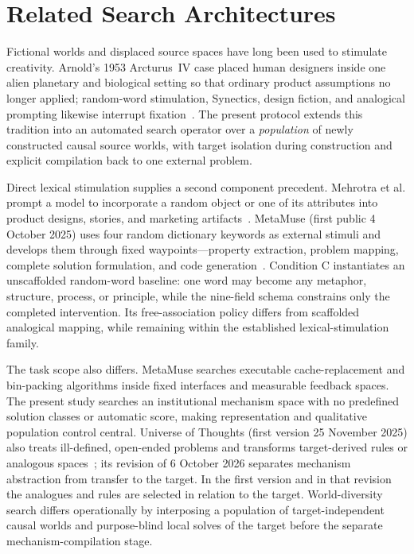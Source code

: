 \documentclass[11pt,a4paper]{article}
\begin{document}
\FloatBarrier

\section{Related Search Architectures}
\label{sec:related}

Fictional worlds and displaced source spaces have long been used to stimulate creativity. Arnold's 1953 Arcturus~IV case placed human designers inside one alien planetary and biological setting so that ordinary product assumptions no longer applied; random-word stimulation, Synectics, design fiction, and analogical prompting likewise interrupt fixation~\cite{arnold1953arcturus,debono1970,eno1975,gordon1961,dunne2013,gentner1983,yasunaga2024analogical}. The present protocol extends this tradition into an automated search operator over a \emph{population} of newly constructed causal source worlds, with target isolation during construction and explicit compilation back to one external problem.

Direct lexical stimulation supplies a second component precedent. Mehrotra et al. prompt a model to incorporate a random object or one of its attributes into product designs, stories, and marketing artifacts~\cite{mehrotra2024associative}. MetaMuse (first public 4 October 2025) uses four random dictionary keywords as external stimuli and develops them through fixed waypoints---property extraction, problem mapping, complete solution formulation, and code generation~\cite{ma2026metamuse}. Condition C instantiates an unscaffolded random-word baseline: one word may become any metaphor, structure, process, or principle, while the nine-field schema constrains only the completed intervention. Its free-association policy differs from scaffolded analogical mapping, while remaining within the established lexical-stimulation family.

The task scope also differs. MetaMuse searches executable cache-replacement and bin-packing algorithms inside fixed interfaces and measurable feedback spaces. The present study searches an institutional mechanism space with no predefined solution classes or automatic score, making representation and qualitative population control central. Universe of Thoughts (first version 25 November 2025) also treats ill-defined, open-ended problems and transforms target-derived rules or analogous spaces~\cite{suzuki2025uot}; its revision of 6 October 2026 separates mechanism abstraction from transfer to the target. In the first version and in that revision the analogues and rules are selected in relation to the target. World-diversity search differs operationally by interposing a population of target-independent causal worlds and purpose-blind local solves of the target before the separate mechanism-compilation stage.
\end{document}
